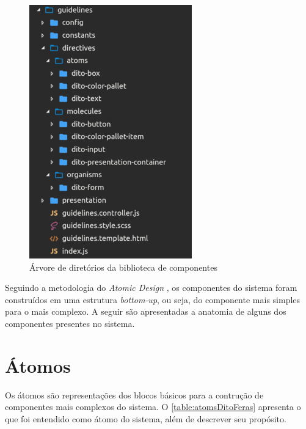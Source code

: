 \begin{figure}
  \begin{center}
	  \includegraphics[]{./04-figuras/06_biblioteca_componentes/source-tree.png}
	\end{center}
  \caption{Árvore de diretórios da biblioteca de componentes}
  \label{fig:sourceTree}
\end{figure}

Seguindo a metodologia do \textit{Atomic Design} \cite{frostAtomicDesign}, os componentes do sistema foram construídos em uma estrutura \textit{bottom-up}, ou seja, do componente mais simples para o mais complexo. A seguir são apresentadas a anatomia de alguns dos componentes presentes no sistema.

\section{Átomos}

Os átomos são representações dos blocos básicos para a contrução de componentes mais complexos do sistema. O \autoref{table:atomsDitoFeras} apresenta o que foi entendido como átomo do sistema, além de descrever seu propósito.

